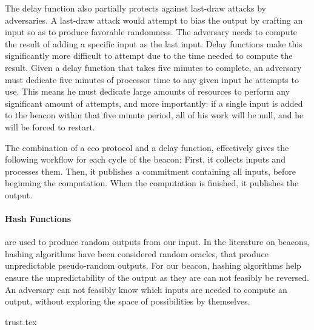 The delay function also partially protects against last-draw attacks by adversaries. A last-draw attack would attempt to bias the output by crafting an input so as to produce favorable randomness. The adversary needs to compute the result of adding a specific input as the last input. Delay functions make this significantly more difficult to attempt due to the time needed to compute the result.
Given a delay function that takes five minutes to complete, an adversary must dedicate five minutes of processor time to any given input he attempts to use. This means he must dedicate large amounts of resources to perform any significant amount of attempts, and more importantly: if a single input is added to the beacon within that five minute period, all of his work will be null, and he will be forced to restart.

The combination of a \gls{cco} protocol and a delay function, effectively gives the following workflow for each cycle of the beacon: First, it collects inputs and processes them. Then, it publishes a commitment containing all inputs, before beginning the computation. When the computation is finished, it publishes the output.

\paragraph{Hash Functions} are used to produce random outputs from our input.
In the literature on beacons, hashing algorithms have been considered random oracles, that produce unpredictable pseudo-random outputs.
For our beacon, hashing algorithms help ensure the unpredictability of the output as they are can not feasibly be reversed.
An adversary can not feasibly know which inputs are needed to compute an output, without exploring the space of possibilities by themselves.

{trust.tex}


